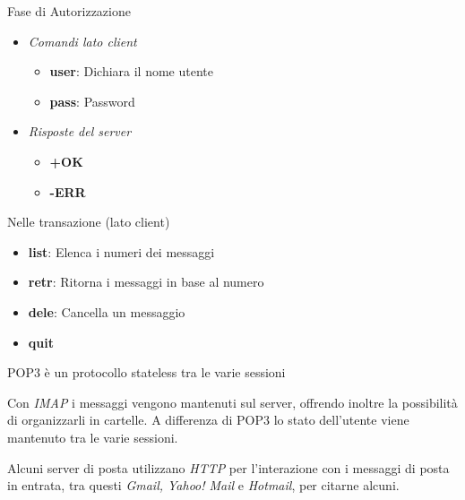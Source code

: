 \documentclass{article}
\newcounter{subsubsubsection}[subsubsection]
\begin{document}
                    Fase di Autorizzazione
                    \begin{itemize}
                        \item \textit{Comandi lato client}
                              \begin{itemize}
                                  \item \textbf{user}: Dichiara il nome utente
                                  \item \textbf{pass}: Password 
                              \end{itemize}
                        \item \textit{Risposte del server}
                              \begin{itemize}
                                  \item \textbf{+OK}
                                  \item \textbf{-ERR}
                              \end{itemize}
                    \end{itemize}
                    Nelle transazione (lato client)
                    \begin{itemize}
                        \item \textbf{list}: Elenca i numeri dei messaggi
                        \item \textbf{retr}: Ritorna i messaggi in base al numero
                        \item \textbf{dele}: Cancella un messaggio
                        \item \textbf{quit}
                    \end{itemize}
                    POP3 è un protocollo stateless tra le varie sessioni

                    Con \textit{IMAP} i messaggi vengono mantenuti sul server, offrendo inoltre la possibilità di organizzarli in cartelle. A differenza di POP3 lo stato dell'utente viene mantenuto tra le varie sessioni. 

                    Alcuni server di posta utilizzano \textit{HTTP} per l'interazione con i messaggi di posta in entrata, tra questi \textit{Gmail, Yahoo! Mail} e \textit{Hotmail}, per citarne alcuni.
\end{document}
